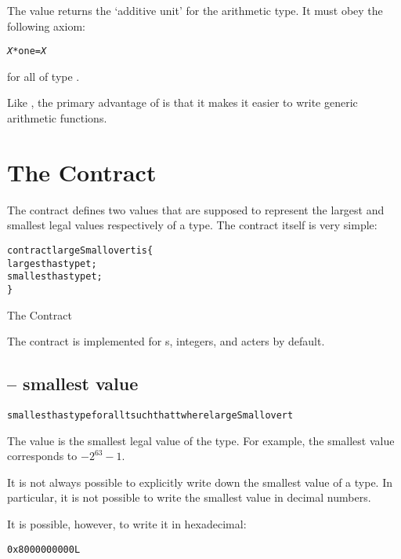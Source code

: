 The  value returns the `additive unit' for the arithmetic type.  It must obey the following axiom:

\begin{alltt}
\emph{X}*one=\emph{X}
\end{alltt}
for all  of type .

Like , the primary advantage of  is that it makes it easier to write generic arithmetic functions.

\section{The  Contract}
\label{largeSmall}
The  contract defines two values that are supposed to represent the largest and smallest legal values respectively of a type. The contract itself is very simple:
\begin{program}
\begin{alltt}
contract largeSmall over t is \{
  largest has type t;
  smallest has type t;
\}
\end{alltt}
\caption{The  Contract}\label{largeSmallProg}
\end{program}

The  contract is implemented for s,  integers,  and acters by default.

\subsection{ -- smallest value}
\begin{alltt}
smallest has type for all t such that t where largeSmall over t
\end{alltt}

The   value is the smallest legal value of the type. For example, the smallest  value corresponds to $-2^{63}-1$.

\begin{aside}
It is not always possible to explicitly write down the smallest value of a type. In particular, it is not possible to write the smallest  value in decimal numbers.
\begin{aside}
It is possible, however, to write it in hexadecimal:
\begin{alltt}
0x8000000000L
\end{alltt}
\end{aside}
\end{aside}

